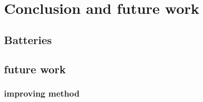 \section{Conclusion and future work}
\subsection{Batteries}
\subsection{future work}
\subsubsection{improving method}
